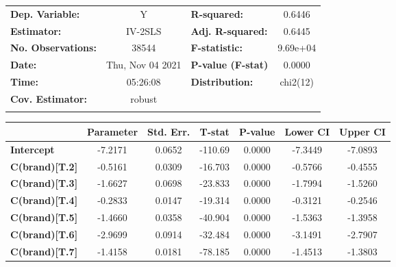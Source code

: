 \begin{center}
\begin{tabular}{lclc}
\toprule
\textbf{Dep. Variable:}    &         Y          & \textbf{  R-squared:         } &      0.6446      \\
\textbf{Estimator:}        &      IV-2SLS       & \textbf{  Adj. R-squared:    } &      0.6445      \\
\textbf{No. Observations:} &       38544        & \textbf{  F-statistic:       } &     9.69e+04     \\
\textbf{Date:}             &  Thu, Nov 04 2021  & \textbf{  P-value (F-stat)   } &      0.0000      \\
\textbf{Time:}             &      05:26:08      & \textbf{  Distribution:      } &     chi2(12)     \\
\textbf{Cov. Estimator:}   &       robust       & \textbf{                     } &                  \\
\textbf{}                  &                    & \textbf{                     } &                  \\
\bottomrule
\end{tabular}
\begin{tabular}{lcccccc}
                        & \textbf{Parameter} & \textbf{Std. Err.} & \textbf{T-stat} & \textbf{P-value} & \textbf{Lower CI} & \textbf{Upper CI}  \\
\midrule
\textbf{Intercept}      &      -7.2171       &       0.0652       &     -110.69     &      0.0000      &      -7.3449      &      -7.0893       \\
\textbf{C(brand)[T.2]}  &      -0.5161       &       0.0309       &     -16.703     &      0.0000      &      -0.5766      &      -0.4555       \\
\textbf{C(brand)[T.3]}  &      -1.6627       &       0.0698       &     -23.833     &      0.0000      &      -1.7994      &      -1.5260       \\
\textbf{C(brand)[T.4]}  &      -0.2833       &       0.0147       &     -19.314     &      0.0000      &      -0.3121      &      -0.2546       \\
\textbf{C(brand)[T.5]}  &      -1.4660       &       0.0358       &     -40.904     &      0.0000      &      -1.5363      &      -1.3958       \\
\textbf{C(brand)[T.6]}  &      -2.9699       &       0.0914       &     -32.484     &      0.0000      &      -3.1491      &      -2.7907       \\
\textbf{C(brand)[T.7]}  &      -1.4158       &       0.0181       &     -78.185     &      0.0000      &      -1.4513      &      -1.3803       \\

\end{tabular}
\end{center}
